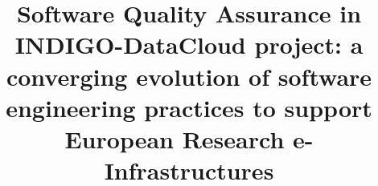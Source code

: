 %
%
%
%
%
%
\RequirePackage{fix-cm}
%
\documentclass[smallextended]{svjour3}       %
%
\smartqed  %
%
\usepackage{graphicx}
\usepackage{array}
\usepackage{subfigure}
\usepackage{adjustbox}
\usepackage{listings}
\usepackage{url}
\usepackage{cite}




%
%
%
%
%


\title{Software Quality Assurance in INDIGO-DataCloud project: a converging evolution of software engineering practices to support European Research e-Infrastructures}

